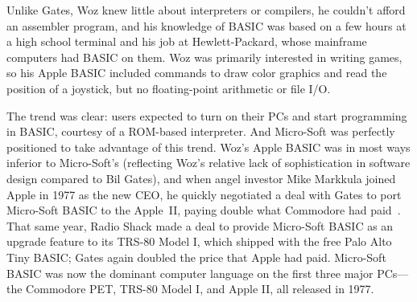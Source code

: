 \begin{tangent}
Unlike Gates, Woz knew little about interpreters or compilers, he
couldn't afford an assembler program, and his knowledge of BASIC was
based on a few hours at a high school terminal and his job at
Hewlett-Packard, whose mainframe computers had BASIC on them.
Woz was primarily interested in writing games, so his Apple BASIC
included commands to draw color graphics and read the position of a
joystick, but no floating-point arithmetic or file I/O.
\end{tangent}


The trend was clear: users expected to turn on their PCs and start
programming in BASIC, courtesy of a ROM-based interpreter.
And Micro-Soft was perfectly positioned to take advantage of this
trend.
Woz's Apple BASIC was in most ways inferior to Micro-Soft's (reflecting
Woz's relative lack of sophistication in software design compared to
Bil Gates), and when angel investor Mike Markkula joined Apple in 1977
as the new CEO, he quickly negotiated a deal with Gates to port
Micro-Soft BASIC to the Apple~II, paying double what Commodore had
paid~\cite[p. 114]{commodore}.
That same year, Radio Shack made a deal to provide Micro-Soft
BASIC as an upgrade feature to its TRS-80 Model I, which shipped with 
the free Palo Alto Tiny BASIC; Gates
again doubled the price that Apple had paid.
Micro-Soft BASIC was now the dominant computer language on the first
three major PCs---the Commodore PET, TRS-80 Model I, and Apple II, all
released in 1977.


